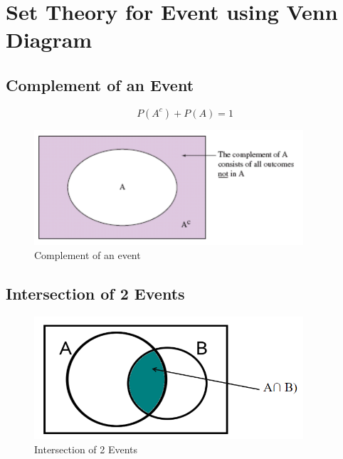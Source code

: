 \documentclass{article}
\begin{document}
    \section*{Set Theory for Event using Venn Diagram}
    \subsection*{Complement of an Event}
        \begin{equation*}
            P(A^{c}) + P(A) = 1
        \end{equation*}
        \begin{figure}[H]
            \centering
            \includegraphics[width=10cm]{figures/complement.PNG}
            \caption{Complement of an event}
            \label{fig:complement}
        \end{figure}

    \subsection*{Intersection of 2 Events}
        \begin{figure}[H]
            \centering
            \includegraphics[width=10cm]{figures/intersection.PNG}
            \caption{Intersection of 2 Events}
            \label{fig:intersection}
        \end{figure}
\end{document}
